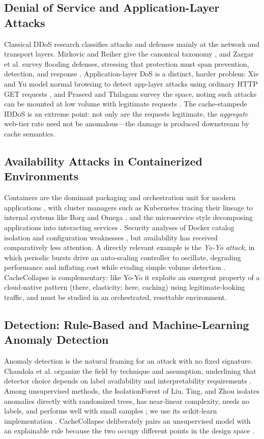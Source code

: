 \documentclass[conference]{IEEEtran}
\begin{document}
\subsection{Denial of Service and Application-Layer Attacks}
Classical DDoS research classifies attacks and defenses mainly at the network and
transport layers. Mirkovic and Reiher give the canonical taxonomy \cite{mirkovic2004},
and Zargar et al. survey flooding defenses, stressing that protection must span
prevention, detection, and response \cite{zargar2013}. Application-layer DoS is a
distinct, harder problem: Xie and Yu model normal browsing to detect app-layer attacks
using ordinary HTTP GET requests \cite{xie2009}, and Praseed and Thilagam survey the
space, noting such attacks can be mounted at low volume with legitimate requests
\cite{praseed2019}. The cache-stampede IDDoS is an extreme point: not only are the
requests legitimate, the \emph{aggregate} web-tier rate need not be anomalous---the
damage is produced downstream by cache semantics.

\subsection{Availability Attacks in Containerized Environments}
Containers are the dominant packaging and orchestration unit for modern applications
\cite{pahl2015,merkel2014}, with cluster managers such as Kubernetes tracing their
lineage to internal systems like Borg and Omega \cite{burns2016}, and the microservice
style decomposing applications into interacting services \cite{dragoni2017}. Security
analyses of Docker catalog isolation and configuration weaknesses
\cite{combe2016,sultan2019}, but availability has received comparatively less
attention. A directly relevant example is the \emph{Yo-Yo attack}, in which periodic
bursts drive an auto-scaling controller to oscillate, degrading performance and
inflating cost while evading simple volume detection \cite{sides2016}. CacheCollapse
is complementary: like Yo-Yo it exploits an emergent property of a cloud-native
pattern (there, elasticity; here, caching) using legitimate-looking traffic, and must
be studied in an orchestrated, resettable environment.

\subsection{Detection: Rule-Based and Machine-Learning Anomaly Detection}
Anomaly detection is the natural framing for an attack with no fixed signature.
Chandola et al. organize the field by technique and assumption, underlining that
detector choice depends on label availability and interpretability requirements
\cite{chandola2009}. Among unsupervised methods, the IsolationForest of Liu, Ting, and
Zhou isolates anomalies directly with randomized trees, has near-linear complexity,
needs no labels, and performs well with small samples \cite{liu2008}; we use its
scikit-learn implementation \cite{pedregosa2011}. CacheCollapse deliberately pairs an
unsupervised model with an explainable rule because the two occupy different points
in the design space \cite{chandola2009}.
\end{document}
